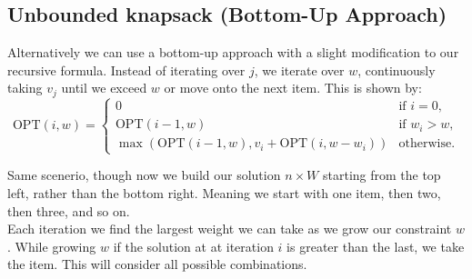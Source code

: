         
        
    


\subsection*{Unbounded knapsack (Bottom-Up Approach)}
\noindent
Alternatively we can use a bottom-up approach with a slight modification to our recursive formula. Instead of iterating over $j$, we iterate over $w$, 
continuously taking $v_j$ until we exceed $w$ or move onto the next item. This is shown by:
\[
\text{OPT}(i, w) = 
\begin{cases} 
    0 & \text{if } i = 0, \\
    \text{OPT}(i-1, w) & \text{if } w_i > w, \\
    \max\left(\text{OPT}(i-1, w), v_i + \text{OPT}(i, w - w_i)\right) & \text{otherwise.}
\end{cases}
\]

\noindent
Same scenerio, though now we build our solution $n\times W$ starting from the top left, rather than the bottom right. 
Meaning we start with one item, then two, then three, and so on.\\

\noindent
Each iteration we find the largest weight we can take as we grow our constraint $w$. While growing $w$ if the solution at 
at iteration $i$ is greater than the last, we take the item. This will consider all possible combinations.\\

